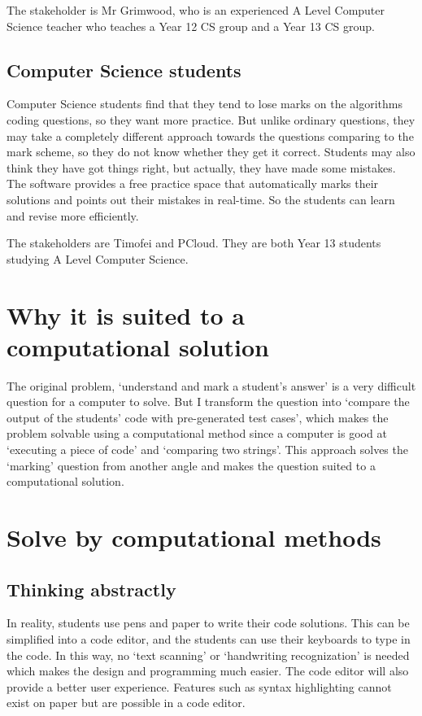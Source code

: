 \documentclass[a4paper]{report}
\begin{document}
The stakeholder is Mr Grimwood, who is an experienced A Level Computer Science teacher who teaches a Year 12 CS group and a Year 13 CS group.

\subsection{Computer Science students}

Computer Science students find that they tend to lose marks on the algorithms coding questions, so they want more practice. But unlike ordinary questions, they may take a completely different approach towards the questions comparing to the mark scheme, so they do not know whether they get it correct. Students may also think they have got things right, but actually, they have made some mistakes. The software provides a free practice space that automatically marks their solutions and points out their mistakes in real-time. So the students can learn and revise more efficiently.

The stakeholders are Timofei and PCloud. They are both Year 13 students studying A Level Computer Science.

\section{Why it is suited to a computational solution}

The original problem, `understand and mark a student's answer' is a very difficult question for a computer to solve. But I transform the question into `compare the output of the students' code with pre-generated test cases', which makes the problem solvable using a computational method since a computer is good at `executing a piece of code' and `comparing two strings'. This approach solves the `marking' question from another angle and makes the question suited to a computational solution.

\section{Solve by computational methods}

\subsection{Thinking abstractly}

In reality, students use pens and paper to write their code solutions. This can be simplified into a code editor, and the students can use their keyboards to type in the code. In this way, no `text scanning' or `handwriting recognization' is needed which makes the design and programming much easier. The code editor will also provide a better user experience. Features such as syntax highlighting cannot exist on paper but are possible in a code editor.
\end{document}

